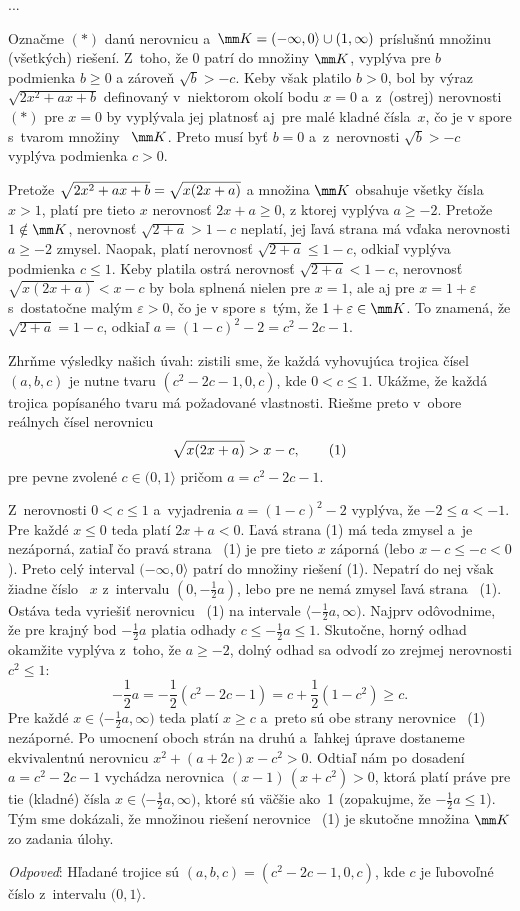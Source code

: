 {%
...}

{%
Označme $(*)$ danú nerovnicu a~$\mm
K=(-\infty,0\rangle\cup(1,\infty)$ príslušnú množinu (všetkých)
riešení. Z~toho, že $0$ patrí do množiny $\mm K$, vyplýva pre $b$
podmienka $b\geq0$ a zároveň $\sqrt{b}>-c$. Keby však platilo $b>0$, bol
by výraz $\sqrt{2x^2+ax+b}$ definovaný v~niektorom okolí bodu $x=0$
a~z~(ostrej) nerovnosti $(*)$ pre $x=0$ by vyplývala jej platnosť
aj~pre malé kladné čísla~$x$, čo je v spore s~tvarom množiny~
$\mm K$. Preto musí byť $b=0$ a~z~nerovnosti $\sqrt{b}>-c$ vyplýva
podmienka $c>0$.

Pretože $\sqrt{2x^2+ax+b\vphantom)}=\sqrt{x(2x+a)}$ a
množina $\mm K$ obsahuje všetky čísla $x>1$, platí pre tieto
$x$ nerovnosť $2x+a\geq0$, z ktorej vyplýva $a\geq{-2}$. Pretože
$1\notin \mm K$, nerovnosť $\sqrt{2+a}>1-c$ neplatí, jej ľavá
strana má vďaka nerovnosti $a\geq{-2}$ zmysel. Naopak, platí nerovnosť
$\sqrt{2+a}\leq1-c$, odkiaľ vyplýva podmienka $c\leq1$. Keby
platila ostrá nerovnosť $\sqrt{2+a}<1-c$, nerovnosť
$\sqrt{x(2x+a)}<x-c$ by bola splnená nielen pre $x=1$, ale aj
pre $x=1+\varepsilon$ s~dostatočne malým $\varepsilon>0$, čo je
v spore s~tým, že $1+\varepsilon\in \mm K$. To znamená, že
$\sqrt{2+a}=1-c$, odkiaľ $a=(1-c)^2-2=c^2-2c-1$.

Zhrňme výsledky našich úvah: zistili sme, že každá vyhovujúca
trojica čísel $(a,b,c)$ je nutne tvaru $(c^2-2c-1,0,c)$, kde
$0<c\leq1$. Ukážme, že každá trojica popísaného
tvaru má požadované vlastnosti. Riešme preto v~obore reálnych
čísel nerovnicu
$$
\sqrt{x(2x+a)}>x-c,                \tag1
$$
pre pevne zvolené $c\in(0,1\rangle$ pričom $a=c^2-2c-1$.

Z~nerovnosti $0<c\leq1$ a~vyjadrenia $a=(1-c)^2-2$ vyplýva, že
${-2}\leq a<{-1}$. Pre každé $x\leq0$ teda platí $2x+a<0$. Ľavá
strana (1) má teda zmysel a~je nezáporná, zatiaľ čo pravá strana~ (1)
je pre tieto $x$ záporná (lebo $x-c\leq-c<0$). Preto celý
interval $(-\infty,0\rangle$ patrí do množiny riešení (1). Nepatrí
do nej však žiadne číslo~ $x$ z~intervalu $(0,-\frac12a)$, lebo pre ne
nemá zmysel ľavá strana~ (1). Ostáva teda vyriešiť nerovnicu~ (1) na
intervale $\langle-\frac12a,\infty)$. Najprv odôvodnime, že pre
krajný bod $-\frac12a$ platia odhady $c\leq-\frac12a\leq1$.
Skutočne, horný odhad okamžite vyplýva z~toho, že $a\geq{-2}$,
dolný odhad sa odvodí zo zrejmej nerovnosti $c^2\leq1$:
$$
-\frac12a =-\frac12(c^2-2c-1)=c+\frac12(1-c^2)\geq c.
$$
Pre každé $x\in\langle-\frac12a,\infty)$ teda platí $x\geq c$
a~preto sú obe strany nerovnice~ (1) nezáporné. Po umocnení oboch
strán na druhú a~ľahkej úprave dostaneme ekvivalentnú nerovnicu
$x^2+(a+2c)x-c^2>0$. Odtiaľ nám po dosadení $a=c^2-2c-1$ vychádza
nerovnica $(x-1)\,(x+c^2)>0$, ktorá platí práve pre tie (kladné)
čísla $x\in\langle-\frac12a,\infty)$, ktoré sú väčšie ako~1
(zopakujme, že $-\frac12a\leq1$). Tým sme dokázali, že množinou
riešení nerovnice~ (1) je skutočne množina $\mm K$ zo zadania úlohy.

{\it Odpoveď\/}: Hľadané trojice sú $(a,b,c)=(c^2-2c-1,0,c)$,
kde $c$ je ľubovoľné číslo z~intervalu $(0,1\rangle$.
}

